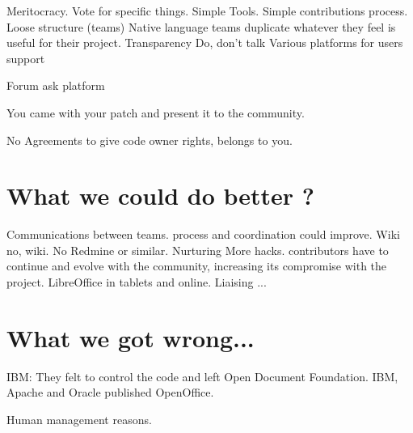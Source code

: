 \documentclass[11pt]{scrartcl}
\begin{document}
Meritocracy.
Vote for specific things.
Simple Tools.
Simple contributions process.
Loose structure (teams)
Native language teams duplicate whatever they feel is useful for their project.
Transparency
Do, don't talk
Various platforms for users support %

Forum %
ask platform %

You came with your patch and present it to the community.

No Agreements to give code owner rights, belongs to you.


\section{What we could do better ?}
\label{sec:better}

Communications between teams. process and coordination could improve.
Wiki no, wiki.
No Redmine or similar.
Nurturing More hacks. contributors have to continue and evolve with the community, increasing its compromise with the project.
LibreOffice in tablets and online. %
Liaising ... %


\section{What we got wrong...}
\label{sec:what-wrong}

IBM: They felt to control the code and left Open Document Foundation. IBM, Apache and Oracle published OpenOffice.

Human management reasons.

\end{document}
